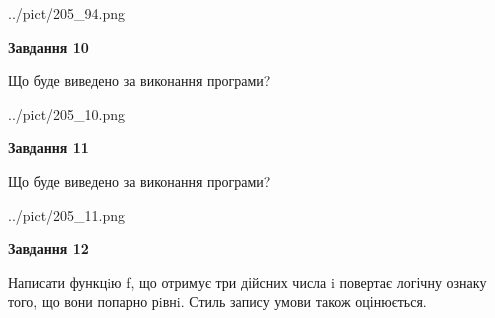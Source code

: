 \documentclass[12pt, ukrainian]{article}
\begin{document}
{\begin {large}
\begin{center}
	{../pict/205_94.png}
\end{center}
\newpage

{\begin {center}\textbf{Завдання 10}\end {center}}

Що буде виведено за виконання програми?\par
\begin{center}
	{../pict/205_10.png}
\end{center}
\newpage

{\begin {center}\textbf{Завдання 11}\end {center}}

Що буде виведено за виконання програми?\par
\begin{center}
	{../pict/205_11.png}
\end{center}
\newpage

{\begin {center}\textbf{Завдання 12}\end {center}}


Написати функцiю f, що отримує три дійсних числа i повертає логічну ознаку того, що вони попарно рiвнi. Стиль запису умови також оцінюється.\par
\newpage

\end {large}}
\end{document}
